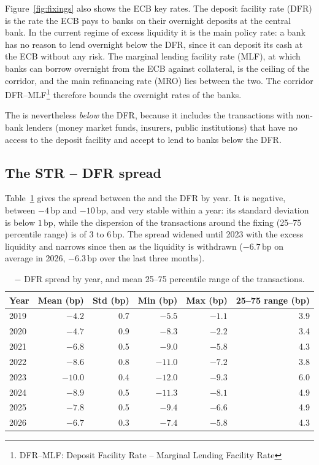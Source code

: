 \documentclass[11pt,a4paper]{article}
\theoremstyle{plain}
\theoremstyle{definition}
\newcommand{\bp}{\,\mathrm{bp}}
\newcommand{\estr}{\text{\texteuro STR}}
\begin{document}
Figure~\ref{fig:fixings} also shows the ECB key rates. The deposit facility rate (DFR) is the rate the ECB pays to banks on their overnight deposits at the central bank. In the current regime of excess liquidity it is the main policy rate: a bank has no reason to lend overnight below the DFR, since it can deposit its cash at the ECB without any risk. The marginal lending facility rate (MLF), at which banks can borrow overnight from the ECB against collateral, is the ceiling of the corridor, and the main refinancing rate (MRO) lies between the two. The corridor DFR--MLF\footnote{DFR--MLF: Deposit Facility Rate -- Marginal Lending Facility Rate} therefore bounds the overnight rates of the banks.

The \estr{} is nevertheless \emph{below} the DFR, because it includes the transactions with non-bank lenders (money market funds, insurers, public institutions) that have no access to the deposit facility and accept to lend to banks below the DFR.

\subsection{The \texteuro STR -- DFR spread}
Table~\ref{tab:spread} gives the spread between the \estr{} and the DFR by year. It is negative, between $-4\bp$ and $-10\bp$, and very stable within a year: its standard deviation is below $1\bp$, while the dispersion of the transactions around the fixing (25--75 percentile range) is of $3$ to $6\bp$. The spread widened until 2023 with the excess liquidity and narrows since then as the liquidity is withdrawn ($-6.7\bp$ on average in 2026, $-6.3\bp$ over the last three months).

\begin{table}[htbp]
\centering
\small
\begin{tabular}{@{}lrrrrr@{}}
\toprule
Year & Mean (bp) & Std (bp) & Min (bp) & Max (bp) & 25--75 range (bp) \\
\midrule
2019 & $-4.2$ & 0.7 & $-5.5$ & $-1.1$ & 3.9 \\
2020 & $-4.7$ & 0.9 & $-8.3$ & $-2.2$ & 3.4 \\
2021 & $-6.8$ & 0.5 & $-9.0$ & $-5.8$ & 4.3 \\
2022 & $-8.6$ & 0.8 & $-11.0$ & $-7.2$ & 3.8 \\
2023 & $-10.0$ & 0.4 & $-12.0$ & $-9.3$ & 6.0 \\
2024 & $-8.9$ & 0.5 & $-11.3$ & $-8.1$ & 4.9 \\
2025 & $-7.8$ & 0.5 & $-9.4$ & $-6.6$ & 4.9 \\
2026 & $-6.7$ & 0.3 & $-7.4$ & $-5.8$ & 4.3 \\
\bottomrule
\end{tabular}
\caption{\estr{} $-$ DFR spread by year, and mean 25--75 percentile range of the transactions.}
\label{tab:spread}
\end{table}
\end{document}
